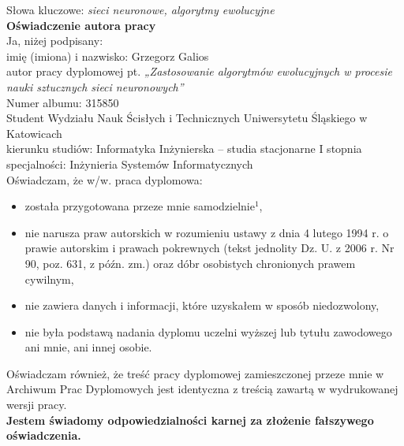 \documentclass[twoside,a4paper,12pt]{extreport} %
\begin{document}
\newpage

\setcounter{page}{1} \pagestyle{fancy}
\renewcommand{\chaptermark}[1]{\markboth{\chaptername%
\ \thechapter:\,\ #1}{}}
\renewcommand{\sectionmark}[1]{\markright{\thesection\,\ #1}}




\newpage
Słowa kluczowe: \hspace{0.5cm} \textit{sieci neuronowe, algorytmy ewolucyjne} \\[1cm]
\textbf{Oświadczenie autora pracy}\\

Ja, niżej podpisany: \\

\hspace{1.5cm} imię (imiona) i nazwisko: Grzegorz Galios \\

\hspace{1.5cm} autor pracy dyplomowej pt. 
\textit{„Zastosowanie algorytmów ewolucyjnych w procesie nauki sztucznych sieci neuronowych”}\\

Numer albumu: 315850 \\

Student Wydziału Nauk Ścisłych i Technicznych Uniwersytetu Śląskiego w Katowicach \\ 

kierunku studiów: Informatyka Inżynierska – studia stacjonarne I stopnia \\

specjalności: Inżynieria Systemów Informatycznych \\

Oświadczam, że w/w. praca dyplomowa:   
\begin{itemize}
\item została przygotowana przeze mnie samodzielnie$^1$,  
\item nie narusza praw autorskich w rozumieniu ustawy z dnia 4 lutego 1994 r. o prawie autorskim i prawach pokrewnych (tekst jednolity Dz. U. z 2006 r. Nr 90, poz. 631, z późn. zm.) oraz dóbr osobistych chronionych prawem cywilnym,  
\item nie zawiera danych i informacji, które uzyskałem w sposób niedozwolony,  
\item nie była podstawą nadania dyplomu uczelni wyższej lub tytułu zawodowego ani mnie, ani innej osobie.  
\end{itemize}
Oświadczam również, że treść pracy dyplomowej zamieszczonej przeze mnie w Archiwum Prac Dyplomowych jest identyczna z treścią zawartą w wydrukowanej wersji pracy. \\[0.5cm]
\textbf{Jestem świadomy odpowiedzialności karnej za złożenie fałszywego oświadczenia.} \\[1.5cm]
\end{document}
